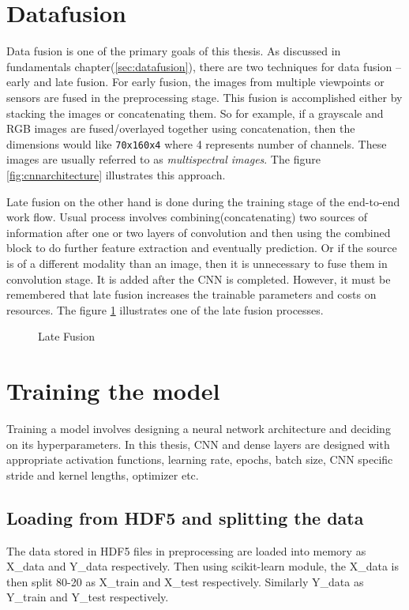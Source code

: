 \section{Datafusion}
\label{sec:datafusion1}
Data fusion is one of the primary goals of this thesis. As discussed in fundamentals
chapter(\ref{sec:datafusion}), there are two techniques for data fusion -- early and late
fusion. For early fusion, the images from multiple viewpoints or sensors are fused in the
preprocessing stage. This fusion is accomplished either by stacking the images or
concatenating them. So for example, if a grayscale and RGB images are fused/overlayed together using
concatenation, then the dimensions would like \texttt{70x160x4} where 4 represents number
of channels. These images are usually referred to as \textit{multispectral images}. The figure \ref{fig:cnnarchitecture} illustrates this approach.

Late fusion on the other hand is done during the training stage of the end-to-end work
flow. Usual process involves combining(concatenating) two sources of information after one
or two layers of convolution and then using the combined block to do further feature
extraction and eventually prediction. Or if the source is of a different modality than an
image, then it is unnecessary to fuse them in convolution stage. It is added after
the CNN is completed. However, it must be remembered that late fusion increases the
trainable parameters and costs on resources. The figure \ref{fig:latefusion} illustrates
one of the late fusion processes.

\begin{figure}[h]
    \centering
    \def\svgwidth{\textwidth}
    
    \caption{Late Fusion}
    \label{fig:latefusion}
\end{figure}

\section{Training the model}
Training a model involves designing a neural network architecture and deciding on its
hyperparameters. In this thesis, CNN and dense layers are designed with appropriate
activation functions, learning rate, epochs, batch size, CNN specific stride and kernel
lengths, optimizer etc.

\subsection{Loading from HDF5 and splitting the data}
The data stored in HDF5 files in preprocessing are loaded into memory as X\_data and
Y\_data respectively. Then using scikit-learn module, the X\_data is then split 80-20
as X\_train and X\_test respectively. Similarly Y\_data as Y\_train and Y\_test respectively.


